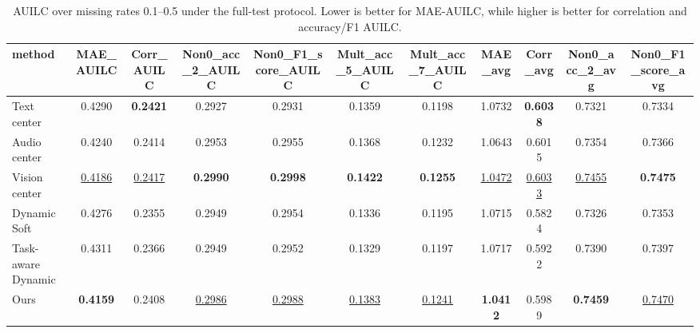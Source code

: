 \begin{table}[t]
\centering
\small
\begin{tabular}{lcccccccccc}
\toprule
method & MAE_AUILC & Corr_AUILC & Non0_acc_2_AUILC & Non0_F1_score_AUILC & Mult_acc_5_AUILC & Mult_acc_7_AUILC & MAE_avg & Corr_avg & Non0_acc_2_avg & Non0_F1_score_avg \\ 
\midrule
Text center & 0.4290 & \textbf{0.2421} & 0.2927 & 0.2931 & 0.1359 & 0.1198 & 1.0732 & \textbf{0.6038} & 0.7321 & 0.7334 \\ 
Audio center & 0.4240 & 0.2414 & 0.2953 & 0.2955 & 0.1368 & 0.1232 & 1.0643 & 0.6015 & 0.7354 & 0.7366 \\ 
Vision center & \underline{0.4186} & \underline{0.2417} & \textbf{0.2990} & \textbf{0.2998} & \textbf{0.1422} & \textbf{0.1255} & \underline{1.0472} & \underline{0.6033} & \underline{0.7455} & \textbf{0.7475} \\ 
Dynamic Soft & 0.4276 & 0.2355 & 0.2949 & 0.2954 & 0.1336 & 0.1195 & 1.0715 & 0.5824 & 0.7326 & 0.7353 \\ 
Task-aware Dynamic & 0.4311 & 0.2366 & 0.2949 & 0.2952 & 0.1329 & 0.1197 & 1.0717 & 0.5922 & 0.7390 & 0.7397 \\ 
Ours & \textbf{0.4159} & 0.2408 & \underline{0.2986} & \underline{0.2988} & \underline{0.1383} & \underline{0.1241} & \textbf{1.0412} & 0.5989 & \textbf{0.7459} & \underline{0.7470} \\ 
\bottomrule
\end{tabular}
\caption{AUILC over missing rates 0.1--0.5 under the full-test protocol. Lower is better for MAE-AUILC, while higher is better for correlation and accuracy/F1 AUILC.}
\label{tab:residual_auilc_01_05}
\end{table}

